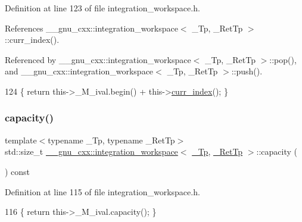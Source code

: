 Definition at line 123 of file integration\+\_\+workspace.\+h.



References \+\_\+\+\_\+gnu\+\_\+cxx\+::integration\+\_\+workspace$<$ \+\_\+\+Tp, \+\_\+\+Ret\+Tp $>$\+::curr\+\_\+index().



Referenced by \+\_\+\+\_\+gnu\+\_\+cxx\+::integration\+\_\+workspace$<$ \+\_\+\+Tp, \+\_\+\+Ret\+Tp $>$\+::pop(), and \+\_\+\+\_\+gnu\+\_\+cxx\+::integration\+\_\+workspace$<$ \+\_\+\+Tp, \+\_\+\+Ret\+Tp $>$\+::push().


\begin{DoxyCode}
124       \{ \textcolor{keywordflow}{return} this->\_M\_ival.begin() + this->\hyperlink{class____gnu__cxx_1_1integration__workspace_a51a384b1777615943add69f1895454f5}{curr\_index}(); \}
\end{DoxyCode}
\mbox{\label{class____gnu__cxx_1_1integration__workspace_ab09606a7308122e0159e49df289d37af}} 
\subsubsection{\texorpdfstring{capacity()}{capacity()}}
{\footnotesize\ttfamily template$<$typename \+\_\+\+Tp, typename \+\_\+\+Ret\+Tp$>$ \\
std\+::size\+\_\+t \hyperlink{class____gnu__cxx_1_1integration__workspace}{\+\_\+\+\_\+gnu\+\_\+cxx\+::integration\+\_\+workspace}$<$ \hyperlink{namespace____gnu__cxx_a3b19a9c800ca194374ef9172290f7d79}{\+\_\+\+Tp}, \hyperlink{namespace____gnu__cxx_a886e03ece3d53ff7fa6c098a40f93fa5}{\+\_\+\+Ret\+Tp} $>$\+::capacity (\begin{DoxyParamCaption}{ }\end{DoxyParamCaption}) const\hspace{0.3cm}{\ttfamily [inline]}}



Definition at line 115 of file integration\+\_\+workspace.\+h.


\begin{DoxyCode}
116       \{ \textcolor{keywordflow}{return} this->\_M\_ival.capacity(); \}
\end{DoxyCode}
\mbox{\label{class____gnu__cxx_1_1integration__workspace_a4e6791e8c8489b9cf5a0cf9f0e1a7fba}} 
